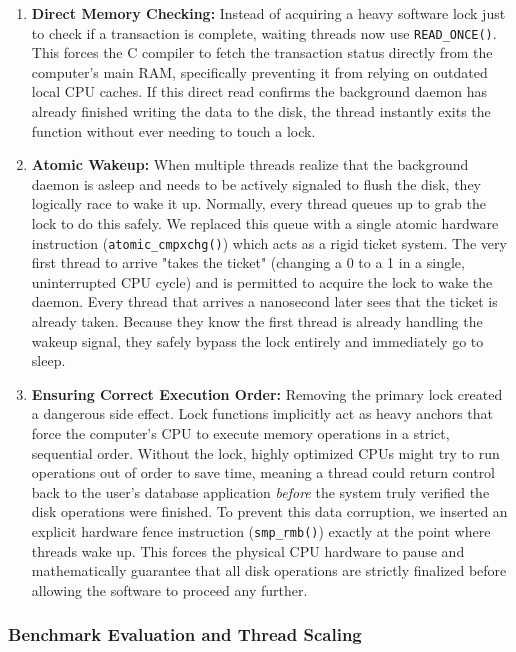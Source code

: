 \begin{enumerate}
    \item \textbf{Direct Memory Checking:} Instead of acquiring a heavy software lock just to check if a transaction is complete, waiting threads now use \texttt{READ\_ONCE()}. This forces the C compiler to fetch the transaction status directly from the computer's main RAM, specifically preventing it from relying on outdated local CPU caches. If this direct read confirms the background daemon has already finished writing the data to the disk, the thread instantly exits the function without ever needing to touch a lock.
    
    \item \textbf{Atomic Wakeup:} When multiple threads realize that the background daemon is asleep and needs to be actively signaled to flush the disk, they logically race to wake it up. Normally, every thread queues up to grab the lock to do this safely. We replaced this queue with a single atomic hardware instruction (\texttt{atomic\_cmpxchg()}) which acts as a rigid ticket system. The very first thread to arrive "takes the ticket" (changing a 0 to a 1 in a single, uninterrupted CPU cycle) and is permitted to acquire the lock to wake the daemon. Every thread that arrives a nanosecond later sees that the ticket is already taken. Because they know the first thread is already handling the wakeup signal, they safely bypass the lock entirely and immediately go to sleep.

    \item \textbf{Ensuring Correct Execution Order:} Removing the primary lock created a dangerous side effect. Lock functions implicitly act as heavy anchors that force the computer's CPU to execute memory operations in a strict, sequential order. Without the lock, highly optimized CPUs might try to run operations out of order to save time, meaning a thread could return control back to the user's database application \textit{before} the system truly verified the disk operations were finished. To prevent this data corruption, we inserted an explicit hardware fence instruction (\texttt{smp\_rmb()}) exactly at the point where threads wake up. This forces the physical CPU hardware to pause and mathematically guarantee that all disk operations are strictly finalized before allowing the software to proceed any further.
\end{enumerate}

\subsubsection{Benchmark Evaluation and Thread Scaling}


